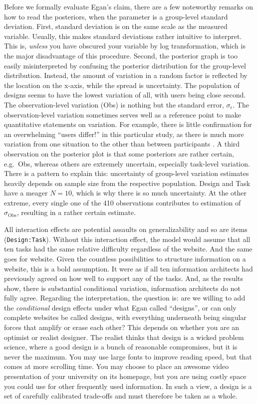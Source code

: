 \documentclass[]{svmono}
\begin{document}
Before we formally evaluate Egan's claim, there are a few noteworthy
remarks on how to read the posteriors, when the parameter is a
group-level standard deviation. First, standard deviation is on the same
scale as the measured variable. Usually, this makes standard deviations
rather intuitive to interpret. This is, \emph{unless} you have obscured
your variable by log transformation, which is the major disadvantage of
this procedure. Second, the posterior graph is too easily misinterpreted
by confusing the posterior distribution for the group-level
distribution. Instead, the amount of variation in a random factor is
reflected by the location on the x-axis, while the spread is
uncertainty. The population of designs seems to have the lowest
variation of all, with users being close second. The observation-level
variation (Obs) is nothing but the standard error, \(\sigma_\epsilon\).
The observation-level variation sometimes serves well as a reference
point to make quantitative statements on variation. For example, there
is little confirmation for an overwhelming ``users differ!'' in this
particular study, as there is much more variation from one situation to
the other than between participants . A third observation on the
posterior plot is that some posteriors are rather certain, e.g.~Obs,
whereas others are extremely uncertain, especially task-level variation.
There is a pattern to explain this: uncertainty of group-level variation
estimates heavily depends on sample size from the respective population.
Design and Task have a meager \(N = 10\), which is why there is so much
uncertainty. At the other extreme, every single one of the 410
observations contributes to estimation of \(\sigma_\textrm{Obs}\),
resulting in a rather certain estimate.

All interaction effects are potential assaults on generalizability and
so are items (\texttt{Design:Task}). Without this interaction effect,
the model would assume that all ten tasks had the same relative
difficulty regardless of the website. And the same goes for website.
Given the countless possibilities to structure information on a website,
this is a bold assumption. It were as if all ten information architects
had previously agreed on how well to support any of the tasks. And, as
the results show, there is substantial conditional variation,
information architects do not fully agree. Regarding the interpretation,
the question is: are we willing to add the \emph{conditional} design
effects under what Egan called ``designs'', or can only complete
websites be called designs, with everything underneath being singular
forces that amplify or erase each other? This depends on whether you are
an optimist or realist designer. The realist thinks that design is a
wicked problem science, where a good design is a bunch of reasonable
compromises, but it is never the maximum. You may use large fonts to
improve reading speed, but that comes at more scrolling time. You may
choose to place an awesome video presentation of your university on its
homepage, but you are using costly space you could use for other
frequently used information. In such a view, a design is a set of
carefully calibrated trade-offs and must therefore be taken as a whole.
\end{document}
